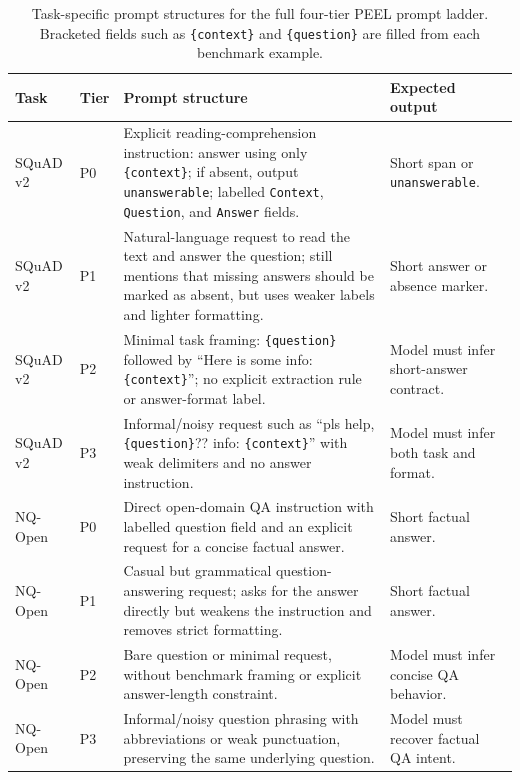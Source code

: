 \documentclass[letterpaper]{article}
\begin{document}
\begin{table}[t]
  \scriptsize
  \centering
  \caption{Task-specific prompt structures for the full four-tier PEEL prompt
  ladder. Bracketed fields such as \texttt{\{context\}} and
  \texttt{\{question\}} are filled from each benchmark example.}
  \label{tab:app_prompt_structures}
  \begin{tabular}{@{}p{2.0cm}p{0.8cm}p{8.2cm}p{3.1cm}@{}}
    \toprule
    Task & Tier & Prompt structure & Expected output \\
    \midrule
    SQuAD v2 & P0 &
    Explicit reading-comprehension instruction: answer using only
    \texttt{\{context\}}; if absent, output \texttt{unanswerable};
    labelled \texttt{Context}, \texttt{Question}, and \texttt{Answer} fields. &
    Short span or \texttt{unanswerable}. \\
    SQuAD v2 & P1 &
    Natural-language request to read the text and answer the question; still
    mentions that missing answers should be marked as absent, but uses weaker
    labels and lighter formatting. &
    Short answer or absence marker. \\
    SQuAD v2 & P2 &
    Minimal task framing: \texttt{\{question\}} followed by
    ``Here is some info: \texttt{\{context\}}''; no explicit extraction rule or
    answer-format label. &
    Model must infer short-answer contract. \\
    SQuAD v2 & P3 &
    Informal/noisy request such as ``pls help, \texttt{\{question\}}?? info:
    \texttt{\{context\}}'' with weak delimiters and no answer instruction. &
    Model must infer both task and format. \\
    \addlinespace[2pt]
    NQ-Open & P0 &
    Direct open-domain QA instruction with labelled question field and an
    explicit request for a concise factual answer. &
    Short factual answer. \\
    NQ-Open & P1 &
    Casual but grammatical question-answering request; asks for the answer
    directly but weakens the instruction and removes strict formatting. &
    Short factual answer. \\
    NQ-Open & P2 &
    Bare question or minimal request, without benchmark framing or explicit
    answer-length constraint. &
    Model must infer concise QA behavior. \\
    NQ-Open & P3 &
    Informal/noisy question phrasing with abbreviations or weak punctuation,
    preserving the same underlying question. &
    Model must recover factual QA intent. \\

\end{tabular}
\end{table}
\end{document}
